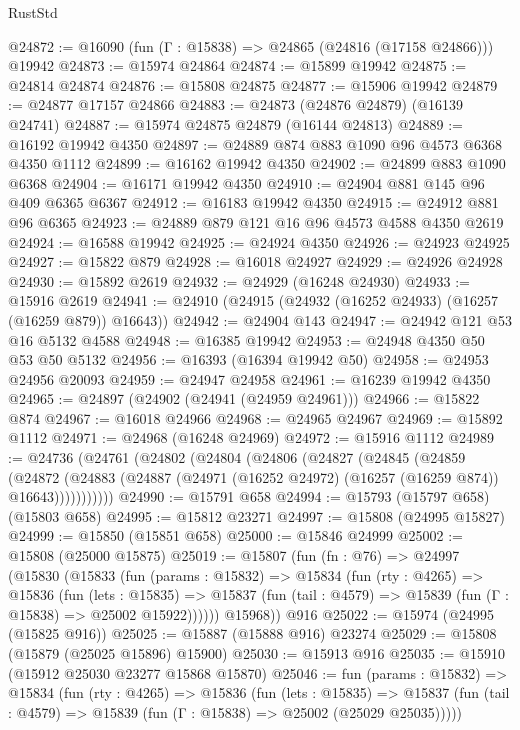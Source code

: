 \begin{lexlean}{RustStd}
\begin{coremodule}
@24872 := @16090 (fun (Γ : @15838) => @24865 (@24816 (@17158 @24866))) @19942
@24873 := @15974 @24864
@24874 := @15899 @19942
@24875 := @24814 @24874
@24876 := @15808 @24875
@24877 := @15906 @19942
@24879 := @24877 @17157 @24866
@24883 := @24873 (@24876 @24879) (@16139 @24741)
@24887 := @15974 @24875 @24879 (@16144 @24813)
@24889 := @16192 @19942 @4350
@24897 := @24889 @874 @883 @1090 @96 @4573 @6368 @4350 @1112
@24899 := @16162 @19942 @4350
@24902 := @24899 @883 @1090 @6368
@24904 := @16171 @19942 @4350
@24910 := @24904 @881 @145 @96 @409 @6365 @6367
@24912 := @16183 @19942 @4350
@24915 := @24912 @881 @96 @6365
@24923 := @24889 @879 @121 @16 @96 @4573 @4588 @4350 @2619
@24924 := @16588 @19942
@24925 := @24924 @4350
@24926 := @24923 @24925
@24927 := @15822 @879
@24928 := @16018 @24927
@24929 := @24926 @24928
@24930 := @15892 @2619
@24932 := @24929 (@16248 @24930)
@24933 := @15916 @2619
@24941 := @24910 (@24915 (@24932 (@16252 @24933) (@16257 (@16259 @879)) @16643))
@24942 := @24904 @143
@24947 := @24942 @121 @53 @16 @5132 @4588
@24948 := @16385 @19942
@24953 := @24948 @4350 @50 @53 @50 @5132
@24956 := @16393 (@16394 @19942 @50)
@24958 := @24953 @24956 @20093
@24959 := @24947 @24958
@24961 := @16239 @19942 @4350
@24965 := @24897 (@24902 (@24941 (@24959 @24961)))
@24966 := @15822 @874
@24967 := @16018 @24966
@24968 := @24965 @24967
@24969 := @15892 @1112
@24971 := @24968 (@16248 @24969)
@24972 := @15916 @1112
@24989 := @24736
    (@24761
      (@24802
        (@24804
          (@24806
            (@24827
              (@24845
                (@24859
                  (@24872
                    (@24883 (@24887 (@24971 (@16252 @24972) (@16257 (@16259 @874)) @16643)))))))))))
@24990 := @15791 @658
@24994 := @15793 (@15797 @658) (@15803 @658)
@24995 := @15812 @23271
@24997 := @15808 (@24995 @15827)
@24999 := @15850 (@15851 @658)
@25000 := @15846 @24999
@25002 := @15808 (@25000 @15875)
@25019 := @15807
    (fun (fn : @76) =>
    @24997
      (@15830
        (@15833
          (fun (params : @15832) =>
          @15834
            (fun (rty : @4265) =>
            @15836
              (fun (lets : @15835) =>
              @15837 (fun (tail : @4579) => @15839 (fun (Γ : @15838) => @25002 @15922))))))
        @15968))
    @916
@25022 := @15974 (@24995 (@15825 @916))
@25025 := @15887 (@15888 @916) @23274
@25029 := @15808 (@15879 (@25025 @15896) @15900)
@25030 := @15913 @916
@25035 := @15910 (@15912 @25030 @23277 @15868 @15870)
@25046 := fun (params : @15832) =>
  @15834
    (fun (rty : @4265) =>
    @15836
      (fun (lets : @15835) =>
      @15837 (fun (tail : @4579) => @15839 (fun (Γ : @15838) => @25002 (@25029 @25035)))))

\end{coremodule}
\end{lexlean}
